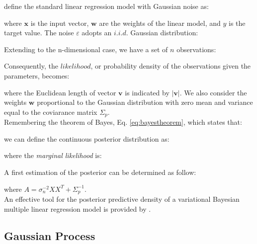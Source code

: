 \citet{RefWorks:192} define the standard linear regression model with Gaussian noise as:

where $\mathbf{x}$ is the input vector, $\mathbf{w}$ are the weights of the
linear model, and $y$ is the target value. The noise $\varepsilon$ adopts an
$i.i.d.$ Gaussian distribution:

Extending to the n-dimensional case, we have a set of $n$ observations:

Consequently, the $likelihood$, or probability density of the observations given
the parameters, becomes:

where the Euclidean length of vector $\mathbf{v}$ is indicated by
$|\mathbf{v}|$.
We also consider the weights $\mathbf{w}$ proportional to the Gaussian
distribution with zero mean and variance equal to the coviarance matrix
$\Sigma_p$.\\
Remembering the theorem of Bayes, Eq. \ref{eq:bayestheorem}, which states that:

we can define the continuous posterior distribution as:

where the \textit{marginal likelihood} is:

A first estimation of the posterior can be determined as follow:

where $A = \sigma_n^{-2} X X^T + \Sigma_p^{-1}$.\\
An effective tool for the posterior predictive density of a variational Bayesian
multiple linear regression model is provided by \citet{RefWorks:193}.



\subsection{Gaussian Process}
\label{subsec:gaussianprocess}

